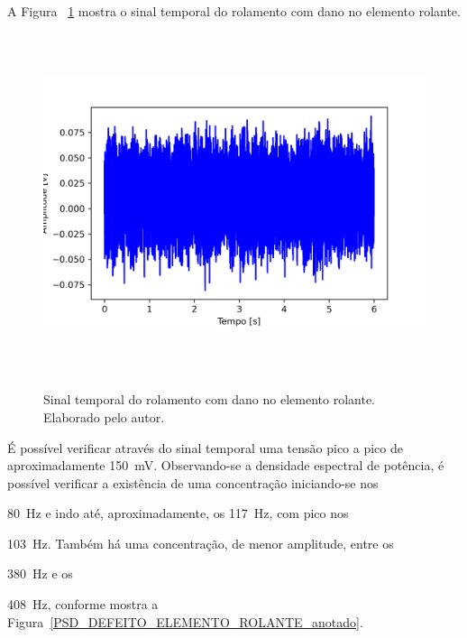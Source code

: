 \documentclass[
	12pt,				
	oneside,			
	a4paper,			
	english,			
	brazil,			
	]{abntex2ppgsi}
\begin{document}
{{{{{{{{{{{{{\newpage
\section{}

A Figura ~\ref{DEFEITO_ELEMENTO_ROLANTE} mostra o sinal temporal do rolamento com dano no elemento rolante. 

\begin{figure}[H]
\centering
\caption {Sinal temporal do rolamento com dano no elemento rolante. Elaborado pelo autor.}
\includegraphics[width=\textwidth,height=100mm,keepaspectratio]{GraficosAnalise/DEFEITO_ELEMENTO_ROLANTE}
\label{DEFEITO_ELEMENTO_ROLANTE}
\end{figure} 

É possível verificar através do sinal temporal uma tensão pico a pico de aproximadamente {\SI{150}{\milli\volt}}. Observando-se a densidade espectral de potência, é possível verificar a existência de uma concentração iniciando-se nos {\SI{80}{\hertz} e indo até, aproximadamente, os {\SI{117}{\hertz}}, com pico nos {\SI{103}{\hertz}. Também há uma concentração, de menor amplitude, entre os {\SI{380}{\hertz} e os {\SI{408}{\hertz}, conforme mostra a Figura~\ref{PSD_DEFEITO_ELEMENTO_ROLANTE_anotado}.

}}}}}}}}}}}}}}}}}
\end{document}
